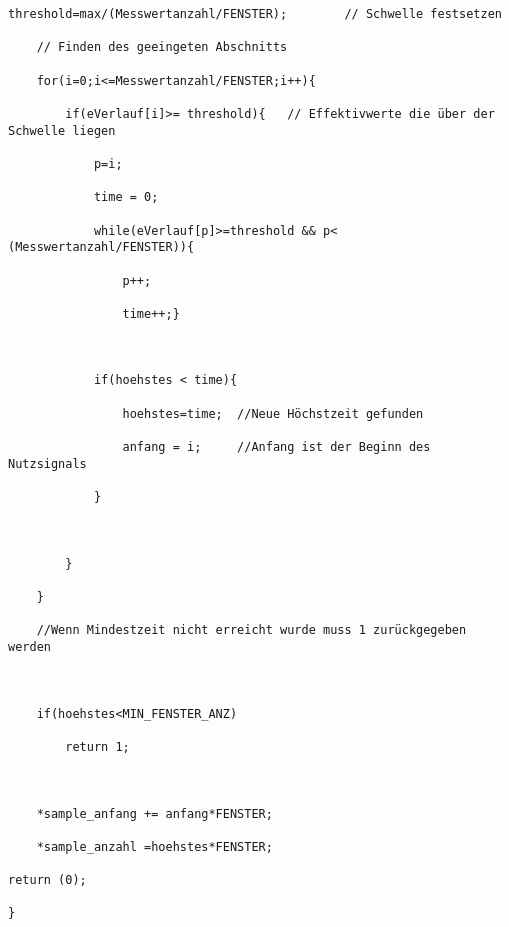 \documentclass[a4paper,12pt]{article}
\begin{document}
\begin{lstlisting}[caption={detection.c}]
	threshold=max/(Messwertanzahl/FENSTER);        // Schwelle festsetzen

	// Finden des geeingeten Abschnitts

	for(i=0;i<=Messwertanzahl/FENSTER;i++){

		if(eVerlauf[i]>= threshold){   // Effektivwerte die über der Schwelle liegen

			p=i;

			time = 0;

			while(eVerlauf[p]>=threshold && p< (Messwertanzahl/FENSTER)){

				p++;

				time++;}



			if(hoehstes < time){

				hoehstes=time;  //Neue Höchstzeit gefunden

				anfang = i;     //Anfang ist der Beginn des Nutzsignals 

			}



		}

	}

	//Wenn Mindestzeit nicht erreicht wurde muss 1 zurückgegeben werden



	if(hoehstes<MIN_FENSTER_ANZ)

		return 1;



	*sample_anfang += anfang*FENSTER;

	*sample_anzahl =hoehstes*FENSTER;

return (0);

}
\end{lstlisting}
\end{document}
